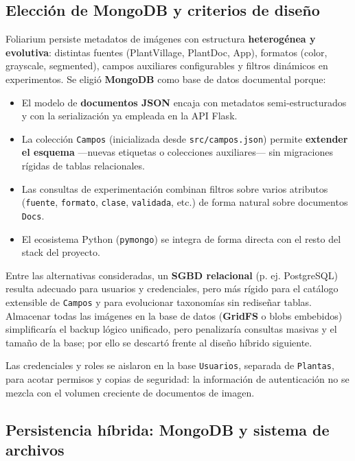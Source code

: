 \documentclass[11pt,spanish,listoffigures,listoftables]{tfgetsinf}
\begin{document}
\subsection{Elección de MongoDB y criterios de diseño}

Foliarium persiste metadatos de imágenes con estructura \textbf{heterogénea y evolutiva}: distintas fuentes (PlantVillage, PlantDoc, App), formatos (color, grayscale, segmented), campos auxiliares configurables y filtros dinámicos en experimentos. Se eligió \textbf{MongoDB} como base de datos documental porque:

\begin{itemize}
    \item El modelo de \textbf{documentos JSON} encaja con metadatos semi-estructurados y con la serialización ya empleada en la API Flask.
    \item La colección \texttt{Campos} (inicializada desde \texttt{src/campos.json}) permite \textbf{extender el esquema} ---nuevas etiquetas o colecciones auxiliares--- sin migraciones rígidas de tablas relacionales.
    \item Las consultas de experimentación combinan filtros sobre varios atributos (\texttt{fuente}, \texttt{formato}, \texttt{clase}, \texttt{validada}, etc.) de forma natural sobre documentos \texttt{Docs}.
    \item El ecosistema Python (\texttt{pymongo}) se integra de forma directa con el resto del stack del proyecto.
\end{itemize}

Entre las alternativas consideradas, un \textbf{SGBD relacional} (p. ej. PostgreSQL) resulta adecuado para usuarios y credenciales, pero más rígido para el catálogo extensible de \texttt{Campos} y para evolucionar taxonomías sin rediseñar tablas. Almacenar todas las imágenes en la base de datos (\textbf{GridFS} o blobs embebidos) simplificaría el backup lógico unificado, pero penalizaría consultas masivas y el tamaño de la base; por ello se descartó frente al diseño híbrido siguiente.

Las credenciales y roles se aislaron en la base \texttt{Usuarios}, separada de \texttt{Plantas}, para acotar permisos y copias de seguridad: la información de autenticación no se mezcla con el volumen creciente de documentos de imagen.

\subsection{Persistencia híbrida: MongoDB y sistema de archivos}
\end{document}
